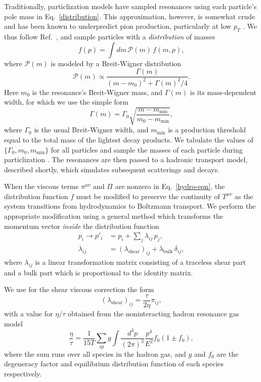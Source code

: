 \documentclass[aps,prc,reprint,amsmath,nofootinbib]{revtex4-1}
\begin{document}
Traditionally, particlization models have sampled resonances using each particle's pole mass in Eq.~\eqref{distribution}.
This approximation, however, is somewhat crude and has been known to underpredict pion production, particularly at low $p_T$ \cite{Sollfrank:1991xm, Huovinen:2016xxq, Vovchenko:2018fmh}.
We thus follow Ref.~\cite{Bernhard:2018hnz}, and sample particles with a \emph{distribution} of masses
\begin{equation}
  f(p) = \int dm\, \mathcal{P}(m)\, f(m, p),
\end{equation}
where $\mathcal{P}(m)$ is modeled by a Breit-Wigner distribution
\begin{equation}
  \mathcal{P}(m) \propto \frac{\Gamma(m)}{(m - m_0)^2 + \Gamma(m)^2/4}.
\end{equation}
Here $m_0$ is the resonance's Breit-Wigner mass, and $\Gamma(m)$ is its mass-dependent width, for which we use the simple form
\begin{equation}
  \Gamma(m) = \Gamma_0 \sqrt{\frac{m - m_\mathrm{min}}{m_0 - m_\mathrm{min}}},
\end{equation}
where $\Gamma_0$ is the usual Breit-Wigner width, and $m_\mathrm{min}$ is a production threshold equal to the total mass of the lightest decay products.
We tabulate the values of $\{\Gamma_0, m_0, m_\mathrm{min}\}$ for all particles and sample the masses of each particle during particlization \cite{PDG:2017}.
The resonances are then passed to a hadronic transport model, described shortly, which simulates subsequent scatterings and decays.

When the viscous terms $\pi^{\mu\nu}$ and $\Pi$ are nonzero in Eq.~\eqref{hydro-eqn}, the distribution function $f$ must be modified to preserve the continuity of $T^{\mu\nu}$ as the system transitions from hydrodynamics to Boltzmann transport.
We perform the appropriate modification using a general method which transforms the momentum vector \emph{inside} the distribution function \cite{Pratt:2010jt}
\begin{align}
  \label{viscous_correction}
  p_i \rightarrow p'_i &= p_i + \sum\limits_j \lambda_{ij}\, p_j,\\
  \lambda_{ij} &= (\lambda_\mathrm{shear})_{ij} + \lambda_\mathrm{bulk}\, \delta_{ij},
\end{align}
where $\lambda_{ij}$ is a linear transformation matrix consisting of a traceless shear part and a bulk part which is proportional to the identity matrix.

We use for the shear viscous correction the form \cite{Pratt:2010jt}
\begin{equation}
  (\lambda_\mathrm{shear})_{ij} = \frac{\tau}{2 \eta} \pi_{ij},
\end{equation}
with a value for $\eta/\tau$ obtained from the noninteracting hadron resonance gas model
\begin{equation}
  \frac{\eta}{\tau} = \frac{1}{15 T} \sum\limits_{sp} g \int \frac{d^3p}{(2\pi)^3}\frac{p^4}{E^2} f_0 (1 \pm f_0),
\end{equation}
where the sum runs over all species in the hadron gas, and $g$ and $f_0$ are the degeneracy factor and equilibrium distribution function of each species respectively.
\end{document}
